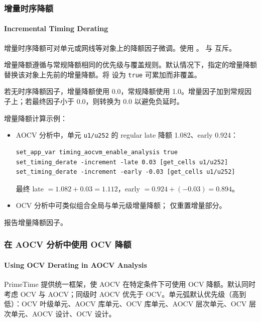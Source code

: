 \subsubsection{增量时序降额}
\paragraph*{Incremental Timing Derating}

增量时序降额可对单元或网线等对象上的降额因子微调。使用 。 与  互斥。

增量降额遵循与常规降额相同的优先级与覆盖规则。默认情况下，指定的增量降额替换该对象上先前的增量降额。将  设为 \texttt{true} 可累加而非覆盖。

若无时序降额因子，增量降额使用 0.0，常规降额使用 1.0。增量因子加到常规因子上；若最终因子小于 0.0，则转换为 0.0 以避免负延时。

增量降额计算示例：
\begin{itemize}
  \item AOCV 分析中，单元 \texttt{u1/u252} 的 regular late 降额 1.082、early 0.924：
\begin{lstlisting}
set_app_var timing_aocvm_enable_analysis true
set_timing_derate -increment -late 0.03 [get_cells u1/u252]
set_timing_derate -increment -early -0.03 [get_cells u1/u252]
\end{lstlisting}
  最终 late $= 1.082 + 0.03 = 1.112$，early $= 0.924 + (-0.03) = 0.894$。
  \item OCV 分析中可类似组合全局与单元级增量降额； 仅重置增量部分。
\end{itemize}

 报告增量降额因子。

\subsubsection{在 AOCV 分析中使用 OCV 降额}
\paragraph*{Using OCV Derating in AOCV Analysis}

PrimeTime 提供统一框架，使 AOCV 在特定条件下可使用 OCV 降额。默认同时考虑 OCV 与 AOCV；同级时 AOCV 优先于 OCV。单元弧默认优先级（高到低）：OCV 叶级单元、AOCV 库单元、OCV 库单元、AOCV 层次单元、OCV 层次单元、AOCV 设计、OCV 设计。

